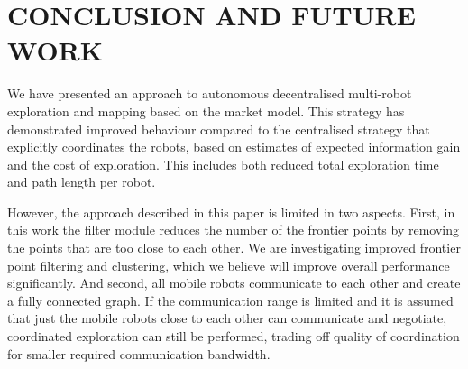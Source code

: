 \documentclass[letterpaper, 10 pt, conference]{ieeeconf}  %
\begin{document}
\section{CONCLUSION AND FUTURE WORK}
We have presented an approach to autonomous decentralised multi-robot exploration and mapping based on the market model. This strategy has demonstrated improved behaviour compared to the centralised strategy that explicitly coordinates the robots, based on estimates of expected information gain and the cost of exploration. This includes both reduced total exploration time and path length per robot.

However, the approach described in this paper is limited in two aspects. First, in this work the filter module reduces the number of the frontier points by removing the points that are too close to each other. We are investigating improved frontier point filtering and clustering, which we believe will improve overall performance significantly. And second, all mobile robots communicate to each other and create a fully connected graph. If the communication range is limited and it is assumed that just the mobile robots close to each other can communicate and negotiate, coordinated exploration can still be performed, trading off quality of coordination for smaller required communication bandwidth.

\addtolength{\textheight}{-12cm}   %

\end{document}
